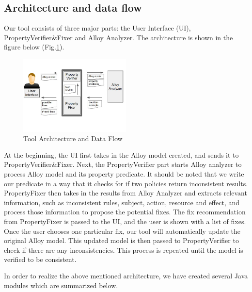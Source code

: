 \documentclass{acm_proc_article-sp}
\begin{document}
\subsection{Architecture and data flow}

Our tool consists of three major parts: the User Interface (UI), PropertyVerifier\&Fixer and Alloy Analyzer. The architecture is shown in the figure below (Fig.\ref{fig:Architecture}).\\

\begin{figure}[h]
\includegraphics[width=0.5\textwidth]{DataFlow.JPG}
\caption{Tool Architecture and Data Flow}    
  \label{fig:Architecture}
\end{figure}

At the beginning, the UI first takes in the Alloy model created, and sends it to PropertyVerifier\&Fixer. Next, the PropertyVerifier part starts Alloy analyzer to process Alloy model and its property predicate. It should be noted that we write our predicate in a way that it checks for if two policies return inconsistent results. PropertyFixer then takes in the results from Alloy Analyzer and extracts relevant information, such as inconsistent rules, subject, action, resource and effect, and process those information to propose the potential fixes. The fix recommendation from PropertyFixer is passed to the UI, and the user is shown with a list of fixes. Once the user chooses one particular fix, our tool will automatically update the original Alloy model. This updated model is then passed to PropertyVerifier to check if there are any inconsistencies. This process is repeated until the model is verified to be consistent.

In order to realize the above mentioned architecture, we have created several Java modules which are summarized below.
\end{document}
